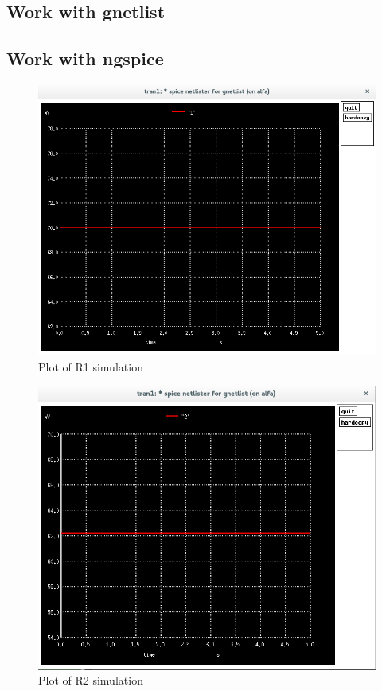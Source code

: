 \documentclass{report}
\begin{document}
\subsection{Work with gnetlist}


\subsection{Work with ngspice}

\begin{figure}[h]
    \centering
    \includegraphics[width=\textwidth]{11.png}
     \caption{Plot of R1 simulation}
    \label{R1}
\end{figure}
\begin{figure}[H]
    \centering
    \includegraphics[width=\textwidth]{12.png}
     \caption{Plot of R2 simulation}
    \label{R2}
\end{figure}
\end{document}
